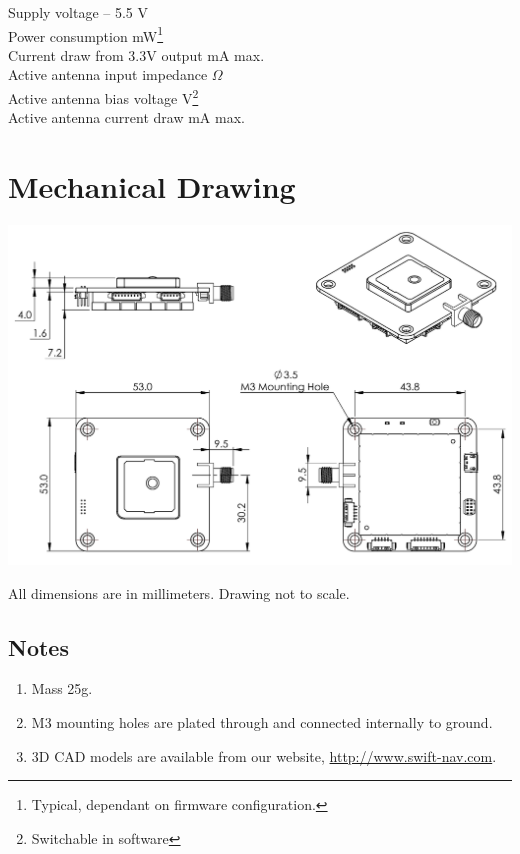 \documentclass{article}
\newenvironment{mpar}{\par\noindent\minipage{\linewidth}}{\endminipage\par}
\begin{document}
\begin{mpar}
\begin{multicols}{2}
  \noindent
  Supply voltage  -- 5.5 V \\
  Power consumption  mW\footnote{Typical, dependant on firmware configuration.} \\
  Current draw from 3.3V output  mA max.\\
  Active antenna input impedance  $\Omega$ \\
  Active antenna bias voltage  V\footnote{Switchable in software}\\
  Active antenna current draw  mA max.
\end{multicols}
\end{mpar}

\section*{Mechanical Drawing}
\begin{center}
  \includegraphics[scale=0.75]{swiftnav_v2_2_mechanical.pdf}
\end{center}

All dimensions are in millimeters. Drawing not to scale.

\subsection*{Notes}
\begin{enumerate}
  \item Mass 25g.
  \item M3 mounting holes are plated through and connected internally to ground.
  \item 3D CAD models are available from our website, \url{http://www.swift-nav.com}.
\end{enumerate}
\end{document}
